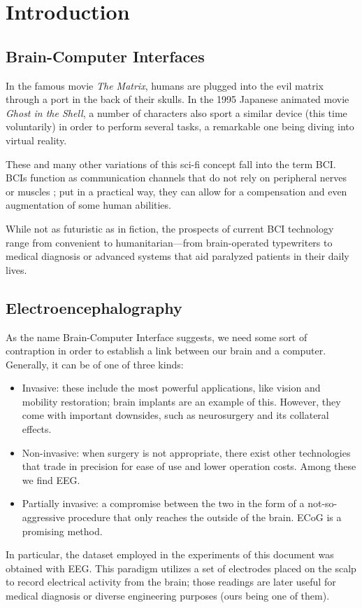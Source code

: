 \chapter{Introduction}\label{ch:introduction}

\section{Brain-Computer Interfaces}

	In the famous movie \textit{The Matrix}, humans are plugged into the evil matrix through a port in the back of their skulls. In the 1995 Japanese animated movie \textit{Ghost in the Shell}, a number of characters also sport a similar device (this time voluntarily) in order to perform several tasks, a remarkable one being diving into virtual reality.

	These and many other variations of this sci-fi concept fall into the term \ac{BCI}. \acs{BCI}s function as communication channels that do not rely on peripheral nerves or muscles \cite{bcidef}; put in a practical way, they can allow for a compensation and even augmentation of some human abilities.

	While not as futuristic as in fiction, the prospects of current \acs{BCI} technology range from convenient to humanitarian---from brain-operated typewriters to medical diagnosis or advanced systems that aid paralyzed patients in their daily lives.

\section{Electroencephalography}

	As the name Brain-Computer Interface suggests, we need some sort of contraption in order to establish a link between our brain and a computer. Generally, it can be of one of three kinds:

	\begin{itemize}

		\item
		Invasive: these include the most powerful applications, like vision and mobility restoration; brain implants are an example of this. However, they come with important downsides, such as neurosurgery and its collateral effects.
		\item
		Non-invasive: when surgery is not appropriate, there exist other technologies that trade in precision for ease of use and lower operation costs. Among these we find \ac{EEG}.
		\item
		Partially invasive: a compromise between the two in the form of a not-so-aggressive procedure that only reaches the outside of the brain. \ac{ECoG} is a promising method.

	\end{itemize}

	In particular, the dataset employed in the experiments of this document was obtained with \acs{EEG}. This paradigm utilizes a set of electrodes placed on the scalp to record electrical activity from the brain; those readings are later useful for medical diagnosis or diverse engineering purposes (ours being one of them).

